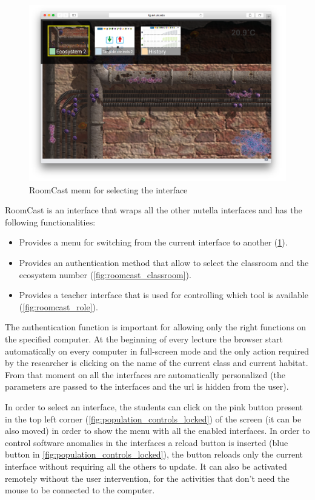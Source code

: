 \begin{figure}
\centering
\includegraphics[width=4.5in]{images/room-cast-menu.png}
\caption{RoomCast menu for selecting the interface}
\label{fig:roomcast_menu}
\end{figure}

RoomCast is an interface that wraps all the other nutella interfaces and has the following functionalities:
\begin{itemize}
\item Provides a menu for switching from the current interface to another (\ref{fig:roomcast_menu}).
\item Provides an authentication method that allow to select the classroom and the ecosystem number (\ref{fig:roomcast_classroom}).
\item Provides a teacher interface that is used for controlling which tool is available (\ref{fig:roomcast_role}).
\end{itemize}
The authentication function is important for allowing only the right functions on the specified computer. At the beginning of every lecture the browser start automatically on every computer in full-screen mode and the only action required by the researcher is clicking on the name of the current class and current habitat. From that moment on all the interfaces are automatically personalized (the parameters are passed to the interfaces and the url is hidden from the user).

In order to select an interface, the students can click on the pink button present in the top left corner (\ref{fig:population_controls_locked}) of the screen (it can be also moved) in order to show the menu with all the enabled interfaces. In order to control software anomalies in the interfaces a reload button is inserted (blue button in \ref{fig:population_controls_locked}), the button reloads only the current interface without requiring all the others to update. It can also be activated remotely without the user intervention, for the activities that don't need the mouse to be connected to the computer.

